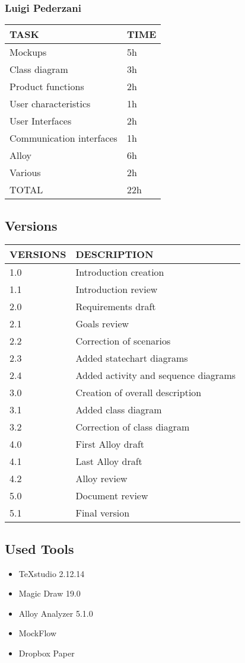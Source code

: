 \subsubsection{Luigi Pederzani}
\hfill
\begin{center}
	\begin{tabular}{ | l | p{6cm} | } 
		\hline
		TASK & TIME \\ 
		\hline
		Mockups & 5h  \\ 
		\hline
		Class diagram & 3h  \\ 
		\hline
		Product functions & 2h \\ 
		\hline
		User characteristics & 1h \\ 
		\hline
		User Interfaces & 2h \\ 
		\hline
		Communication interfaces & 1h \\ 
		\hline
		Alloy & 6h   \\ 
		\hline
		Various & 2h  \\ 
		\hline
		TOTAL & 22h \\ 
		\hline
	\end{tabular}
\end{center}

\newpage
\subsection{Versions}
\hfill
\hfill
\begin{center}
	\begin{tabular}{ | l | p{6cm} | } 
		\hline
			VERSIONS & DESCRIPTION  \\ 
		\hline
		1.0 & Introduction creation   \\ 
		\hline
		1.1 & Introduction review  \\ 
		\hline
		2.0 & Requirements draft \\ 
		\hline
		2.1 & Goals review \\ 
		\hline
		2.2 & Correction of scenarios \\ 
		\hline
		2.3 & Added statechart diagrams   \\ 
		\hline
		2.4 & Added activity and sequence diagrams  \\ 
		\hline
		3.0 & Creation of overall description \\ 
		\hline
		3.1 & Added class diagram \\ 
		\hline
		3.2 & Correction of class diagram \\ 
		\hline
		4.0 & First Alloy draft  \\ 
		\hline
		4.1 & Last Alloy draft \\ 
		\hline
		4.2 & Alloy review \\ 
		\hline
		5.0 & Document review \\ 
		\hline
		5.1 & Final version \\ 
		\hline
	\end{tabular}
\end{center}

\subsection{Used Tools}

\begin{itemize}
	\item TeXstudio 2.12.14
	\item Magic Draw 19.0
	\item Alloy Analyzer 5.1.0
	\item MockFlow
	\item Dropbox Paper
\end{itemize}